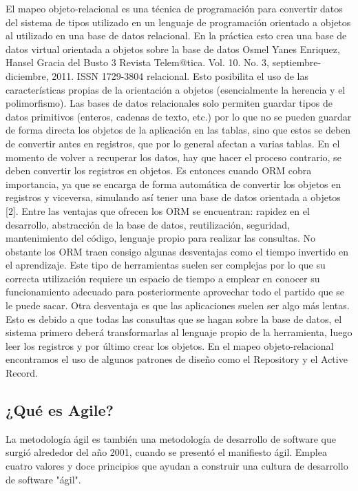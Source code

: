 \documentclass[preprint,12pt]{elsarticle}
\begin{document}
El mapeo objeto-relacional es una técnica de programación para convertir datos del sistema de tipos
utilizado en un lenguaje de programación orientado a objetos al utilizado en una base de datos
relacional. En la práctica esto crea una base de datos virtual orientada a objetos sobre la base de datos 
Osmel Yanes Enriquez, Hansel Gracia del Busto
3
 Revista Telem@tica. Vol. 10. No. 3, septiembre-diciembre, 2011. ISSN 1729-3804
relacional. Esto posibilita el uso de las características propias de la orientación a objetos (esencialmente
la herencia y el polimorfismo).
Las bases de datos relacionales solo permiten guardar tipos de datos primitivos (enteros, cadenas de
texto, etc.) por lo que no se pueden guardar de forma directa los objetos de la aplicación en las tablas,
sino que estos se deben de convertir antes en registros, que por lo general afectan a varias tablas. En el
momento de volver a recuperar los datos, hay que hacer el proceso contrario, se deben convertir los
registros en objetos. Es entonces cuando ORM cobra importancia, ya que se encarga de forma
automática de convertir los objetos en registros y viceversa, simulando así tener una base de datos
orientada a objetos [2].
Entre las ventajas que ofrecen los ORM se encuentran: rapidez en el desarrollo, abstracción de la base
de datos, reutilización, seguridad, mantenimiento del código, lenguaje propio para realizar las consultas.
No obstante los ORM traen consigo algunas desventajas como el tiempo invertido en el aprendizaje.
Este tipo de herramientas suelen ser complejas por lo que su correcta utilización requiere un espacio de
tiempo a emplear en conocer su funcionamiento adecuado para posteriormente aprovechar todo el
partido que se le puede sacar. Otra desventaja es que las aplicaciones suelen ser algo más lentas. Esto es
debido a que todas las consultas que se hagan sobre la base de datos, el sistema primero deberá
transformarlas al lenguaje propio de la herramienta, luego leer los registros y por último crear los
objetos.
En el mapeo objeto-relacional encontramos el uso de algunos patrones de diseño como el Repository y
el Active Record.
\cite{referenciarobles2}


\subsection{¿Qué es Agile?}
La metodología ágil es también una metodología de desarrollo de software que surgió alrededor del año 2001, cuando se presentó el manifiesto ágil. Emplea cuatro valores y doce principios que ayudan a construir una cultura de desarrollo de software "ágil".
\end{document}
